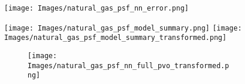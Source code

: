 \documentclass[12pt,letterpaper]{article}
\begin{document}
\begin{figure}[h]
\centering
\texttt{[image: Images/natural\_gas\_psf\_nn\_error.png]}
\end{figure}

\begin{figure}[h]
\centering
\texttt{[image: Images/natural\_gas\_psf\_model\_summary.png]}
\texttt{[image: Images/natural\_gas\_psf\_model\_summary\_transformed.png]}
\end{figure}

\begin{figure}[H]
\begin{subfigure}[H]{1\textwidth}
\texttt{[image: Images/natural\_gas\_psf\_nn\_full\_pvo\_transformed.png]}
\end{subfigure}
\end{figure}
\FloatBarrier
\end{document}
